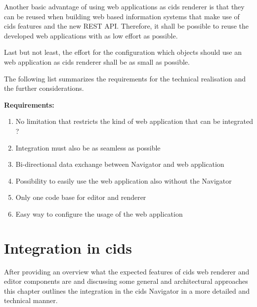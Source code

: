 
Another basic advantage of using web applications as cids renderer is that they can be reused when building web based information systems that make use of cids features and the new REST API.
Therefore, it shall be possible to reuse the developed web applications with as low effort as possible.


Last but not least, the effort for the configuration which objects should use an web application as cids renderer shall be as small as possible.

The following list summarizes the requirements for the technical realisation and the further considerations.

\textbf{Requirements:}
\begin{enumerate}
\item No limitation that restricts the kind of web application that can be integrated ?
\item Integration must also be as seamless as possible 
\item Bi-directional data exchange between Navigator and web application
\item Possibility to easily use the web application also without the Navigator
\item Only one code base for editor and renderer
\item Easy way to configure the usage of the web application
\end{enumerate} 


\section{Integration in cids}

After providing an overview what the expected features of cids web renderer and editor components are and discussing some general and architectural approaches this chapter outlines the integration in the cids Navigator in a more detailed and technical manner.

